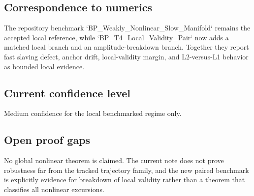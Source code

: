 \subsection{Correspondence to numerics}
The repository benchmark `BP_Weakly_Nonlinear_Slow_Manifold` remains the accepted local reference, while `BP_T4_Local_Validity_Pair` now adds a matched local branch and an amplitude-breakdown branch. Together they report fast slaving defect, anchor drift, local-validity margin, and L2-versus-L1 behavior as bounded local evidence.

\subsection{Current confidence level}
Medium confidence for the local benchmarked regime only.

\subsection{Open proof gaps}
No global nonlinear theorem is claimed. The current note does not prove robustness far from the tracked trajectory family, and the new paired benchmark is explicitly evidence for breakdown of local validity rather than a theorem that classifies all nonlinear excursions.
